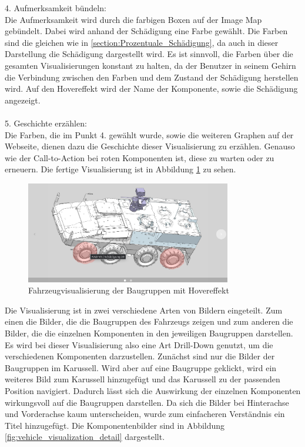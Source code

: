 4. Aufmerksamkeit bündeln:\\
Die Aufmerksamkeit wird durch die farbigen Boxen auf der Image Map gebündelt. Dabei wird anhand der Schädigung eine Farbe gewählt. Die Farben sind die gleichen wie in \ref{section:Prozentuale_Schädigung}, da auch in dieser Darstellung die Schädigung dargestellt wird. Es ist sinnvoll, die Farben über die gesamten Visualisierungen konstant zu halten, da der Benutzer in seinem Gehirn die Verbindung zwischen den Farben und dem Zustand der Schädigung herstellen wird. Auf den Hovereffekt wird der Name der Komponente, sowie die Schädigung angezeigt.\\\\
5. Geschichte erzählen:\\
Die Farben, die im Punkt 4. gewählt wurde, sowie die weiteren Graphen auf der Webseite, dienen dazu die Geschichte dieser Visualisierung zu erzählen. Genauso wie der Call-to-Action bei \glqq roten\grqq{} Komponenten ist, diese zu warten oder zu erneuern. Die fertige Visualisierung ist in Abbildung \ref{fig:vehicle_visualization_after} zu sehen. 
\begin{figure}[h!]
\centering
\includegraphics[width=0.8\textwidth]{gfx/vehicle_visualisation_after.png}
\caption{Fahrzeugvisualisierung der Baugruppen mit Hovereffekt}
\label{fig:vehicle_visualization_after}
\end{figure}
\noindent
Die Visualisierung ist in zwei verschiedene Arten von Bildern eingeteilt. Zum einen die Bilder, die die Baugruppen des Fahrzeugs zeigen und zum anderen die Bilder, die die einzelnen Komponenten in den jeweiligen Baugruppen darstellen. Es wird bei dieser Visualisierung also eine Art Drill-Down genutzt, um die verschiedenen Komponenten darzustellen. Zunächst sind nur die Bilder der Baugruppen im Karussell. Wird aber auf eine Baugruppe geklickt, wird ein weiteres Bild zum Karussell hinzugefügt und das Karussell zu der passenden Position navigiert. Dadurch lässt sich die Auswirkung der einzelnen Komponenten wirkungsvoll auf die Baugruppen darstellen. Da sich die Bilder bei Hinterachse und Vorderachse kaum unterscheiden, wurde zum einfacheren Verständnis ein Titel hinzugefügt. Die Komponentenbilder sind in Abbildung \ref{fig:vehicle_visualization_detail} dargestellt.
